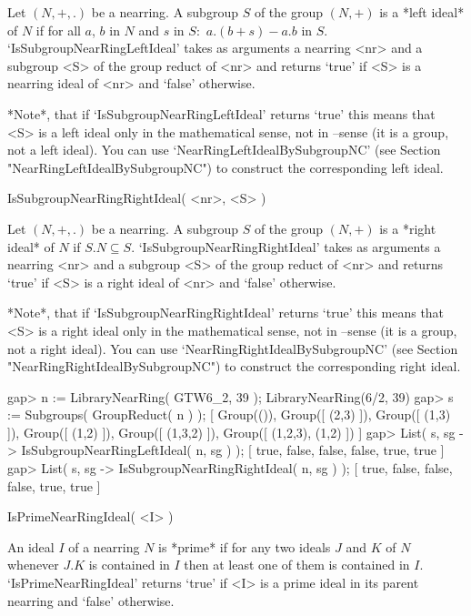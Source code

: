 Let $(N,+,.)$ be a nearring. A subgroup $S$ of the group $(N,+)$ is a
*left ideal* of $N$ if for all $a$, $b$ in $N$ and  $s$ in $S$:\
$a.(b+s)-a.b$ in $S$. 
`IsSubgroupNearRingLeftIdeal' takes as arguments a nearring <nr> and a subgroup
<S> of the group reduct of <nr> and returns `true' if <S> is a nearring
ideal of <nr> and `false' otherwise.

*Note*, that if `IsSubgroupNearRingLeftIdeal' returns `true' this means that
<S> is a left ideal only in the mathematical sense, not in {\GAP}--sense (it is
a group, not a left ideal). You can use `NearRingLeftIdealBySubgroupNC' (see
Section "NearRingLeftIdealBySubgroupNC") to construct the corresponding left
ideal.

\>IsSubgroupNearRingRightIdeal( <nr>, <S> )

Let $(N,+,.)$ be a nearring. A subgroup $S$ of the group $(N,+)$ is a
*right ideal* of $N$ if $S.N \subseteq S$.
`IsSubgroupNearRingRightIdeal' takes as arguments a nearring <nr> and a
subgroup <S> of the group reduct of <nr> and returns `true' if <S> is a
right ideal of <nr> and `false' otherwise.

*Note*, that if `IsSubgroupNearRingRightIdeal' returns `true' this means that
<S> is a right ideal only in the mathematical sense, not in {\GAP}--sense (it
is a group, not a right ideal). You can use
`NearRingRight\-Ideal\-BySubgroupNC' (see Section
"NearRingRightIdealBySubgroupNC") to construct the corresponding right ideal.

\beginexample
    gap> n := LibraryNearRing( GTW6_2, 39 );                    
    LibraryNearRing(6/2, 39)
    gap> s := Subgroups( GroupReduct( n ) );
    [ Group(()), Group([ (2,3) ]), Group([ (1,3) ]), Group([ (1,2) ]), 
      Group([ (1,3,2) ]), Group([ (1,2,3), (1,2) ]) ]
    gap> List( s, sg -> IsSubgroupNearRingLeftIdeal( n, sg ) );
    [ true, false, false, false, true, true ]
    gap> List( s, sg -> IsSubgroupNearRingRightIdeal( n, sg ) );
    [ true, false, false, false, true, true ]
\endexample

\Section{Special ideal properties}


\>IsPrimeNearRingIdeal( <I> )

An ideal $I$ of a nearring $N$ is *prime* if for any two ideals $J$ and $K$
of $N$ whenever $J.K$ is contained in $I$ then at least one of them is
contained in $I$.
`IsPrimeNearRingIdeal' returns `true' if <I> is a prime ideal in its parent
nearring and `false' otherwise.

